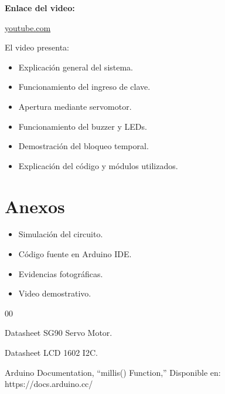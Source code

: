 \documentclass[conference]{IEEEtran}
\begin{document}
\vspace{0.3cm}

\noindent
\textbf{Enlace del video:}

\url{youtube.com}

\vspace{0.3cm}

\noindent
El video presenta:

\begin{itemize}
    \item Explicación general del sistema.
    \item Funcionamiento del ingreso de clave.
    \item Apertura mediante servomotor.
    \item Funcionamiento del buzzer y LEDs.
    \item Demostración del bloqueo temporal.
    \item Explicación del código y módulos utilizados.
\end{itemize}

\section*{Anexos}

\begin{itemize}
    \item Simulación del circuito.
    \item Código fuente en Arduino IDE.
    \item Evidencias fotográficas.
    \item Video demostrativo.
\end{itemize}

\begin{thebibliography}{00}

 Datasheet SG90 Servo Motor.

 Datasheet LCD 1602 I2C.

 Arduino Documentation, ``millis() Function,'' Disponible en: https://docs.arduino.cc/

\end{thebibliography}
\end{document}
